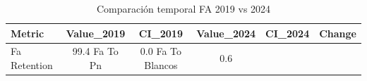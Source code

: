 \begin{table}
\caption{Comparación temporal FA 2019 vs 2024}
\label{tab:fa_temporal_comparison}
\begin{tabular}{lcccc}
\toprule
Metric & Value_2019 & CI_2019 & Value_2024 & CI_2024 & Change \\
\midrule
Fa Retention & 99.4%
Fa To Pn & 0.0%
Fa To Blancos & 0.6%
\bottomrule
\end{tabular}
\end{table}

